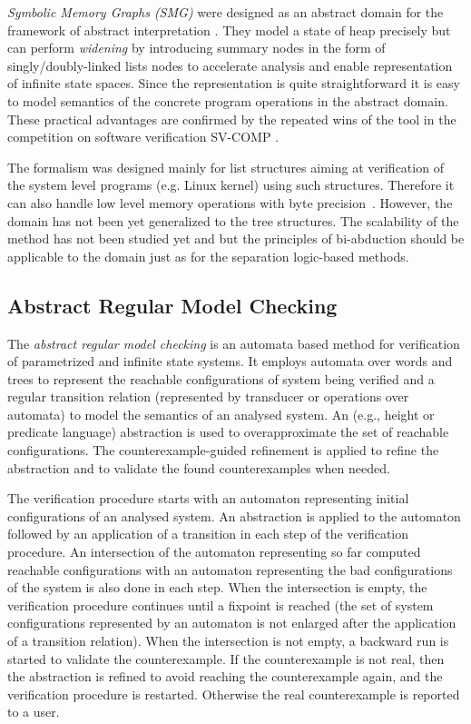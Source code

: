 	  \emph{Symbolic Memory Graphs (SMG)} \cite{dudka13sas} were designed as
	  an abstract domain for the framework of abstract interpretation \cite{cousot:popl77}.
	  They model a state of heap precisely but can perform \emph{widening} by introducing
	  summary nodes in the form of singly/doubly-linked lists nodes to
	  accelerate analysis and enable representation of infinite state spaces.
	  Since the representation is quite straightforward it is easy to model
	  semantics of the concrete program operations in the abstract domain.
	  These practical advantages are confirmed by the repeated wins of the tool in the competition on software verification SV-COMP \cite{svcomopweb}.

	  The formalism was designed mainly for list structures aiming at verification
	  of the system level programs (e.g. Linux kernel) using such structures.
	  Therefore it can also handle low level memory operations with byte precision~\cite{dudka13sas}.
	  However, the domain has not been yet generalized to the tree structures.
	  The scalability of the method has not been studied yet and but the principles of bi-abduction
	  should be applicable to the domain just as for the separation logic-based methods.

	  \subsection{Abstract Regular Model Checking}
	  \label{subsection:armc}
	  The \emph{abstract regular model checking} \cite{artmc} is an automata based method for verification of parametrized and infinite state systems.
	  It employs automata over words and trees to represent the reachable configurations of system being verified
	  and a regular transition relation (represented by transducer or operations over automata) to model the semantics of an analysed system.
	  An (e.g., height or predicate language) abstraction is used to
	  overapproximate the set of reachable configurations.
	  The counterexample-guided refinement is applied to
	  refine the abstraction and to validate the found counterexamples when needed.

	  The verification procedure starts with an automaton representing
	  initial configurations of an analysed system.
	  An abstraction is applied to the automaton followed by an application
	  of a transition in each step of the verification procedure.
	  An intersection of the automaton representing so far computed reachable configurations with an automaton representing
	  the bad configurations of the system is also done in each step.
	  When the intersection is empty, the verification procedure continues
	  until a fixpoint is reached (the set of system configurations represented by an automaton
	  is not enlarged after the application of a transition relation).
	  When the intersection is not empty, a backward run is started to validate the counterexample.
	  If the counterexample is not real, then the abstraction is refined to avoid reaching
	  the counterexample again, and the verification procedure is restarted.
	  Otherwise the real counterexample is reported to a user.

